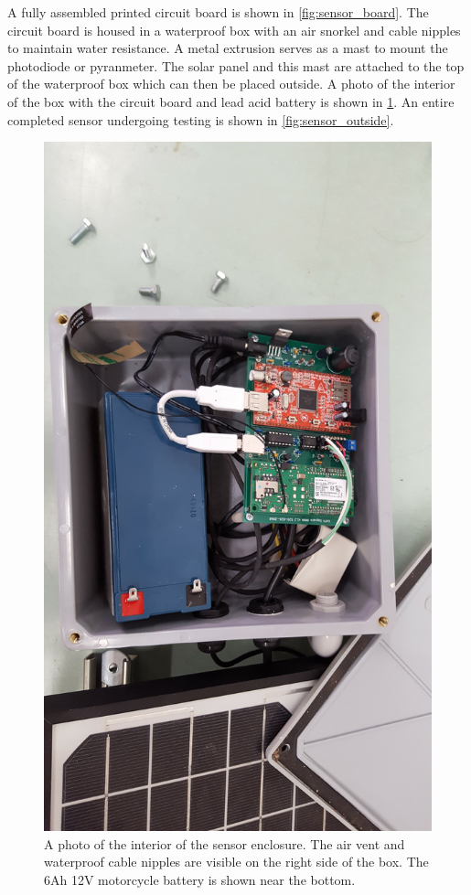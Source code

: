 A fully assembled printed circuit board is shown in
\cref{fig:sensor_board}.
The circuit board is housed in a waterproof box with an air snorkel
and cable nipples to maintain water resistance.
A metal extrusion serves as a mast to mount the photodiode or
pyranmeter.
The solar panel and this mast are attached to the top of the
waterproof box which can then be placed outside.
A photo of the interior of the box with the circuit board and lead
acid battery is shown in \cref{fig:sensor_int}.
An entire completed sensor undergoing testing is shown in
\cref{fig:sensor_outside}.

\begin{figure}[ht]
  \includegraphics[width=\textwidth]{figs/sensor_interior.jpg}
\caption[Interior of the sensor enclosure]{A photo of the interior of
  the sensor enclosure. The air vent and waterproof cable nipples are
  visible on the right side of the box. The 6Ah 12V motorcycle battery
  is shown near the bottom.}
\label{fig:sensor_int}
\end{figure}

